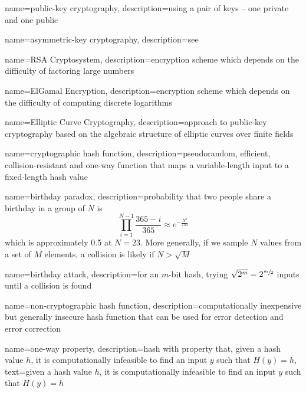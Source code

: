 {
    name={public-key cryptography},
    description={using a pair of keys -- one private and one public}
}

{
    name={asymmetric-key cryptography},
    description={see }
}

{
    name={RSA Cryptosystem},
    description={encryption scheme which depends on the difficulty of factoring large numbers}
}

{
    name={ElGamal Encryption},
    description={encryption scheme which depends on the difficulty of computing discrete logarithms}
}

{
    name={Elliptic Curve Cryptography},
    description={approach to public-key cryptography based on the algebraic structure of elliptic curves over finite fields}
}

{
    name={cryptographic hash function},
    description={pseudorandom, efficient, collision-resistant and one-way function that maps a variable-length input to a fixed-length hash value}
}

{
    name={birthday paradox},
    description={probability that two people share a birthday in a group of $N$ is \[\prod_{i=1}^{N-1}\frac{365 - i}{365} \approx e^{-\frac{N^2}{730}}\] which is approximately 0.5 at $N=23$. More generally, if we sample $N$ values from a set of $M$ elements, a collision is likely if $N > \sqrt{M}$}
}

{
    name={birthday attack},
    description={for an $m$-bit hash, trying $\sqrt{2^m} = 2^{\sfrac{m}{2}}$ inputs until a collision is found}
}

{
    name={non-cryptographic hash function},
    description={computationally inexpensive but generally insecure hash function that can be used for error detection and error correction}
}

{
    name={one-way property},
    description={hash with property that, given a hash value $h$, it is computationally infeasible to find an input $y$ such that $H(y) = h$},
    text={given a hash value $h$, it is computationally infeasible to find an input $y$ such that $H(y) = h$}
}

